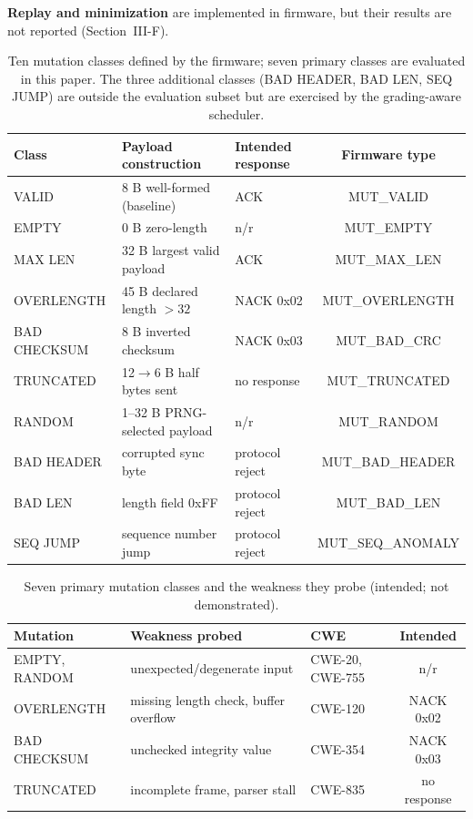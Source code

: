 \documentclass[10pt,letterpaper]{article}
\begin{document}
\textbf{Replay and minimization} are implemented in firmware, but their results are not reported (Section~III-F).

\begin{table}[htbp]
\centering
\caption{Ten mutation classes defined by the firmware; seven primary classes are evaluated in this paper. The three additional classes (BAD HEADER, BAD LEN, SEQ JUMP) are outside the evaluation subset but are exercised by the grading-aware scheduler.}
\label{tab:mutation_classes}
\begin{tabular}{p{1.6cm}p{4.3cm}p{3.9cm}c}
\toprule
\textbf{Class} & \textbf{Payload construction} & \textbf{Intended response} & \textbf{Firmware type}\\
\midrule
VALID & 8 B well-formed (baseline) & ACK & MUT_VALID\\
EMPTY & 0 B zero-length & n/r & MUT_EMPTY\\
MAX LEN & 32 B largest valid payload & ACK & MUT_MAX_LEN\\
OVERLENGTH & 45 B declared length $>32$ & NACK 0x02 & MUT_OVERLENGTH\\
BAD CHECKSUM & 8 B inverted checksum & NACK 0x03 & MUT_BAD_CRC\\
TRUNCATED & 12$\to$6 B half bytes sent & no response & MUT_TRUNCATED\\
RANDOM & 1--32 B PRNG-selected payload & n/r & MUT_RANDOM\\
BAD HEADER & corrupted sync byte & protocol reject & MUT_BAD_HEADER\\
BAD LEN & length field 0xFF & protocol reject & MUT_BAD_LEN\\
SEQ JUMP & sequence number jump & protocol reject & MUT_SEQ_ANOMALY\\
\bottomrule
\end{tabular}
\end{table}

\begin{table}[htbp]
\centering
\caption{Seven primary mutation classes and the weakness they probe (intended; not demonstrated).}
\label{tab:cwe_map}
\begin{tabular}{p{2.2cm}p{4.6cm}p{2.8cm}c}
\toprule
\textbf{Mutation} & \textbf{Weakness probed} & \textbf{CWE} & \textbf{Intended}\\
\midrule
EMPTY, RANDOM & unexpected/degenerate input & CWE-20, CWE-755 & n/r\\
OVERLENGTH & missing length check, buffer overflow & CWE-120 & NACK 0x02\\
BAD CHECKSUM & unchecked integrity value & CWE-354 & NACK 0x03\\
TRUNCATED & incomplete frame, parser stall & CWE-835 & no response\\
\bottomrule
\end{tabular}
\end{table}
\end{document}
